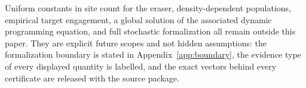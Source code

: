 Uniform constants in site count for the eraser, density-dependent populations,
empirical target engagement, a global solution of the associated dynamic
programming equation, and full stochastic formalization all remain outside this
paper. They are explicit future scopes and not hidden assumptions: the
formalization boundary is stated in Appendix~\ref{app:boundary}, the evidence
type of every displayed quantity is labelled, and the exact vectors behind every
certificate are released with the source package.
